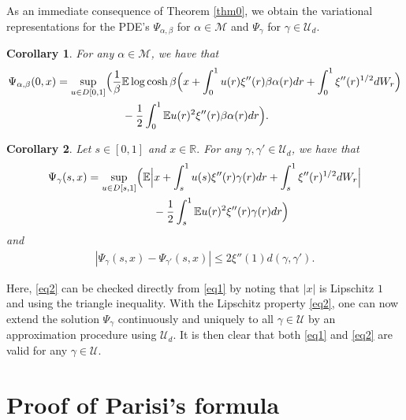 \documentclass[12pt]{article}
\newcommand{\e}{\mathbb{E}}
\newtheorem{corollary}{\bf Corollary}
\newenvironment{Proof of lemma}{\noindent{\bf Proof of Lemma}}{\hfill$\Box$\newline}
\newenvironment{Proof of theorem}{\noindent{\bf Proof of Theorem}}{\hfill{\footnotesize${\square}$}\newline}
\newenvironment{Proof of theorems}{\noindent{\bf Proof of Theorems}}{\hfill$\Box$\newline}
\newenvironment{Proof of proposition}{\noindent{\bf Proof of Proposition}}{\hfill$\Box$\newline}
\newenvironment{Proof of propositions}{\noindent{\bf Proof of Propositions}}{\hfill$\Box$\newline}
\newenvironment{Proof of exercise}{\noindent{\it Proof of Exercise:}}{\hfill$\Box$}
\begin{document}
As an immediate consequence of Theorem \ref{thm0},  we obtain the variational representations for the PDE's $\Psi_{\alpha,\beta}$ for $\alpha\in\mathcal{M}$ and $\Psi_\gamma$ for $\gamma\in\mathcal{U}_d.$

\begin{corollary}
For any $\alpha\in\mathcal{M}$, we have that
\begin{align}
\begin{split}\label{cor1:eq1}
\Psi_{\alpha,\beta}(0,x)&=\sup_{u\in D[0,1]}\Bigl(\frac{1}{\beta}\e \log \cosh \beta\Bigl(x+\int_{0}^1 u(r)\xi''(r)\beta\alpha(r)dr+\int_0^1\xi''(r)^{1/2}dW_r\Bigr)\\
&\qquad\qquad\qquad-\frac{1}{2}\int_{0}^1\e  u(r)^2\xi''(r)\beta\alpha(r)dr\Bigr).
\end{split}
\end{align}
\end{corollary}
\begin{corollary}\label{cor2}
	Let $s\in[0,1]$ and $x\in\mathbb{R}.$ For any $\gamma,\gamma'\in\mathcal{U}_d$, we have that
		\begin{align}
		\begin{split}\label{eq1}
		\Psi_{\gamma}(s,x)&=\sup_{u\in D[s,1]}\Bigl(\e \Bigl|x+\int_{s}^1 u(s)\xi''(r)\gamma(r)dr+\int_s^1\xi''(r)^{1/2}dW_r\Bigr|\\
		&\qquad\qquad\qquad-\frac{1}{2}\int_{s}^1\e  u(r)^2\xi''(r)\gamma(r)dr\Bigr)
		\end{split}
		\end{align}
		and
		\begin{align}
		\label{eq2}
				|\Psi_\gamma(s,x)-\Psi_{\gamma'}(s,x)|\leq 2\xi''(1)d(\gamma,\gamma').
		\end{align}
\end{corollary}

Here, \eqref{eq2} can be checked directly from \eqref{eq1} by noting that $|x|$ is Lipschitz $1$ and using the triangle inequality. With the Lipschitz property \eqref{eq2}, one can now extend the solution $\Psi_\gamma$ continuously and uniquely to all $\gamma\in\mathcal{U}$ by an approximation procedure using $\mathcal{U}_d.$ It is then clear that both \eqref{eq1} and \eqref{eq2} are valid for any $\gamma\in\mathcal{U}.$ 


\section{Proof of Parisi's formula}\label{sec3}
\end{document}
